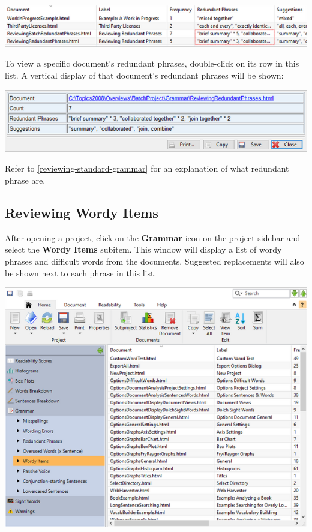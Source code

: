 \documentclass[
]{book}
\theoremstyle{definition}
\theoremstyle{definition}
\theoremstyle{definition}
\theoremstyle{definition}
\theoremstyle{remark}
\begin{document}
\includegraphics{Images/batchredundantphrasesmultiple.png}

To view a specific document's redundant phrases, double-click on its row in this list. A vertical display of that document's redundant phrases will be shown:

\begin{center}\includegraphics[width=0.75\linewidth,]{Images/batchredundantphrasesviewitem} \end{center}

Refer to \ref{reviewing-standard-grammar} for an explanation of what redundant phrase are.

\hypertarget{reviewing-batch-wordiness}{%
\subsection*{Reviewing Wordy Items}\label{reviewing-batch-wordiness}}

After opening a project, click on the \textbf{Grammar} icon on the project sidebar and select the \textbf{Wordy Items} subitem. This window will display a list of wordy phrases and difficult words from the documents. Suggested replacements will also be shown next to each phrase in this list.

\includegraphics{Images/batchwordyphrases.png}
\end{document}
